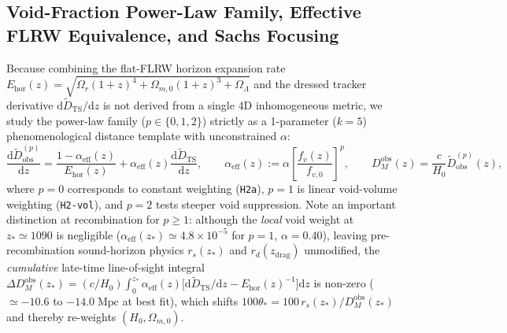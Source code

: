 \documentclass[11pt,a4paper]{article}
\begin{document}
\subsection{Void-Fraction Power-Law Family, Effective FLRW Equivalence, and Sachs Focusing}
Because combining the flat-FLRW horizon expansion rate $E_{\mathrm{hor}}(z) = \sqrt{\Omega_r(1+z)^4 + \Omega_{m,0}(1+z)^3 + \Omega_{\Lambda}}$ and the dressed tracker derivative $\mathrm{d}\widetilde{D}_{\mathrm{TS}}/\mathrm{d}z$ is not derived from a single 4D inhomogeneous metric, we study the power-law family ($p \in \{0, 1, 2\}$) strictly as a 1-parameter ($k = 5$) phenomenological distance template with unconstrained $\alpha$:
\begin{equation}
    \frac{\mathrm{d}\widetilde{D}_{\mathrm{obs}}^{(p)}}{\mathrm{d}z} = \frac{1 - \alpha_{\mathrm{eff}}(z)}{E_{\mathrm{hor}}(z)} + \alpha_{\mathrm{eff}}(z)\frac{\mathrm{d}\widetilde{D}_{\mathrm{TS}}}{\mathrm{d}z}, \qquad \alpha_{\mathrm{eff}}(z) := \alpha\left[\frac{f_v(z)}{f_{v,0}}\right]^p, \qquad D_M^{\mathrm{obs}}(z) = \frac{c}{H_0}\widetilde{D}_{\mathrm{obs}}^{(p)}(z),
    \label{eq:h2-vol}
\end{equation}
where $p = 0$ corresponds to constant weighting (\texttt{H2a}), $p = 1$ is linear void-volume weighting (\texttt{H2-vol}), and $p = 2$ tests steeper void suppression. Note an important distinction at recombination for $p \ge 1$: although the \textit{local} void weight at $z_* \simeq 1090$ is negligible ($\alpha_{\mathrm{eff}}(z_*) \simeq 4.8\times 10^{-5}$ for $p = 1$, $\alpha = 0.40$), leaving pre-recombination sound-horizon physics $r_s(z_*)$ and $r_d(z_{\mathrm{drag}})$ unmodified, the \textit{cumulative} late-time line-of-sight integral $\Delta D_M^{\mathrm{obs}}(z_*) = (c/H_0)\int_0^{z_*}\alpha_{\mathrm{eff}}(z)\bigl[\mathrm{d}\widetilde{D}_{\mathrm{TS}}/\mathrm{d}z - E_{\mathrm{hor}}(z)^{-1}\bigr]\mathrm{d}z$ is non-zero ($\simeq -10.6$ to $-14.0\;\mathrm{Mpc}$ at best fit), which shifts $100\theta_* = 100\,r_s(z_*)/D_M^{\mathrm{obs}}(z_*)$ and thereby re-weights $(H_0, \Omega_{m,0})$.
\end{document}
